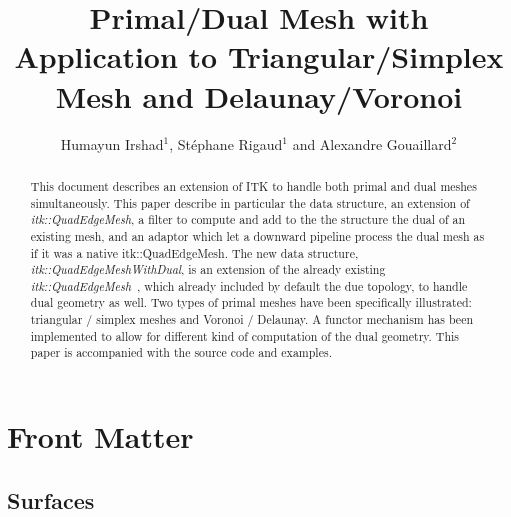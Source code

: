 \documentclass{InsightArticle}
\title{Primal/Dual Mesh with Application to Triangular/Simplex Mesh and Delaunay/Voronoi}
\author{Humayun Irshad$^{1}$, St\'{e}phane Rigaud$^{1}$ and Alexandre Gouaillard$^{2}$}
\newcommand{\IJhandlerIDnumber}{3392}
\begin{document}
%
% 
\IJhandlefooter{\IJhandlerIDnumber}


\ifpdf
\else
\fi


\maketitle


\ifhtml
\chapter*{Front Matter\label{front}}
\fi


\begin{abstract}
\noindent
This document describes an extension of ITK to handle both primal and dual meshes simultaneously. This paper describe in particular the data structure, an extension of \emph{itk::QuadEdgeMesh}, a filter to compute and add to the the structure the dual of an existing mesh, and an adaptor which let a downward pipeline process the dual mesh as if it was a native itk::QuadEdgeMesh. The new data structure, \emph{itk::QuadEdgeMeshWithDual}, is an extension of the already existing \emph{itk::QuadEdgeMesh}~\cite{Gouaillard2006}, which already included by default the due topology, to handle dual geometry as well. Two types of primal meshes have been specifically illustrated: triangular / simplex meshes and Voronoi / Delaunay. A functor mechanism has been implemented to allow for different kind of computation of the dual geometry. This paper is accompanied with the source code and examples.
\end{abstract}
\IJhandlenote{\IJhandlerIDnumber}
\tableofcontents
\section{Surfaces}
\end{document}
